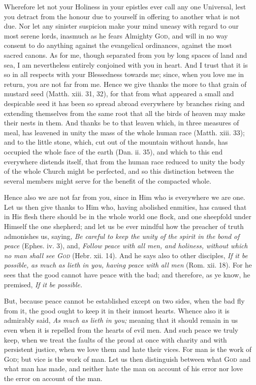 Wherefore let not your Holiness in your epistles ever call any one Universal, lest you detract from the honour due to yourself in offering to another what is not due. Nor let any sinister suspicion make your mind uneasy with regard to our most serene lords, inasmuch as he fears Almighty \textsc{God}, and will in no way consent to do anything against the evangelical ordinances, against the most sacred canons. As for me, though separated from you by long spaces of land and sea, I am nevertheless entirely conjoined with you in heart. And I trust that it is so in all respects with your Blessedness towards me; since, when you love me in return, you are not far from me. Hence we give thanks the more to that grain of mustard seed (Matth. xiii. 31, 32), for that from what appeared a small and despicable seed it has been so spread abroad everywhere by branches rising and extending themselves from the same root that all the birds of heaven may make their nests in them. And thanks be to that leaven which, in three measures of meal, has leavened in unity the mass of the whole human race (Matth. xiii. 33); and to the little stone, which, cut out of the mountain without hands, has occupied the whole face of the earth (Dan. ii. 35), and which to this end everywhere distends itself, that from the human race reduced to unity the body of the whole Church might be perfected, and so this distinction between the several members might serve for the benefit of the compacted whole.

Hence also we are not far from you, since in Him who is everywhere we are one. Let us then give thanks to Him who, having abolished enmities, has caused that in His flesh there should be in the whole world one flock, and one sheepfold under Himself the one shepherd; and let us be ever mindful how the preacher of truth admonishes us, saying, \emph{Be careful to keep the unity of the spirit in the bond of peace} (Ephes. iv. 3), and, \emph{Follow peace with all men, and holiness, without which no man shall see \textsc{God}} (Hebr. xii. 14). And he says also to other disciples, \emph{If it be possible, as much as lieth in you, having peace with all men} (Rom. xii. 18). For he sees that the good cannot have peace with the bad; and therefore, as ye know, he premised, \emph{If it be possible.}

But, because peace cannot be established except on two sides, when the bad fly from it, the good ought to keep it in their inmost hearts. Whence also it is admirably said, \emph{As much as lieth in you;} meaning that it should remain in us even when it is repelled from the hearts of evil men. And such peace we truly keep, when we treat the faults of the proud at once with charity and with persistent justice, when we love them and hate their vices. For man is the work of \textsc{God}; but vice is the work of man. Let us then distinguish between what \textsc{God} and what man has made, and neither hate the man on account of his error nor love the error on account of the man.

